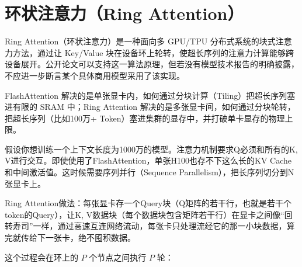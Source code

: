 \clearpage

\hypertarget{ux73afux72b6ux6ce8ux610fux529bring-attention}{%
\section{环状注意力（Ring Attention）}\label{ux73afux72b6ux6ce8ux610fux529bring-attention}}

Ring Attention（环状注意力）是一种面向多 GPU/TPU 分布式系统的块式注意力方法，通过让 Key/Value 块在设备环上轮转，使超长序列的注意力计算能够跨设备展开。公开论文可以支持这一算法原理，但若没有模型技术报告的明确披露，不应进一步断言某个具体商用模型采用了该实现。

FlashAttention 解决的是单张显卡内，如何通过分块计算（Tiling）把超长序列塞进有限的 SRAM 中；Ring Attention 解决的是多张显卡间，如何通过分块轮转，把超长序列（比如100万+ Token）塞进集群的显存中，并打破单卡显存的物理上限。

假设你想训练一个上下文长度为1000万的模型。注意力机制要求Q必须和所有的K, V进行交互。即使使用了FlashAttention，单张H100也存不下这么长的KV Cache和中间激活值。这时候需要序列并行（Sequence Parallelism），把长序列切分到N张显卡上。

Ring Attention做法：每张显卡存一个Query块（Q矩阵的若干行，也就是若干个token的Query），让K, V数据块（每个数据块包含矩阵若干行）在显卡之间像``回转寿司''一样，通过高速互连网络流动，每张卡只处理流经它的那一小块数据，算完就传给下一张卡，绝不囤积数据。

这个过程会在环上的 \(P\) 个节点之间执行 \(P\) 轮：

